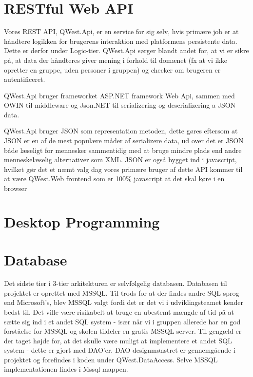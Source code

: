 \section{RESTful Web API}\label{sec:REST}
Vores REST API, QWest.Api, er en service for sig selv, hvis primære job er at håndtere logikken for brugerens interaktion med platformens persistente data. Dette er derfor under Logic-tier. QWest.Api sørger blandt andet for, at vi er sikre på, at data der håndteres giver mening i forhold til domænet (fx at vi ikke opretter en gruppe, uden personer i gruppen) og checker om brugeren er autentificeret.

QWest.Api bruger frameworket ASP.NET framework Web Api, sammen med OWIN\cite{Owin} til middleware og Json.NET til serializering og deserializering a JSON data.

QWest.Api bruger JSON som representation metoden, dette gøres eftersom at JSON er en af de mest populære måder af serializere data, ud over det er JSON både læseligt for mennesker sammentidig med at bruge mindre plads end andre menneskelæselig alternativer som XML. JSON er også bygget ind i javascript, hvilket gør det et næmt valg dag vores primære bruger af dette API kommer til at være QWest.Web frontend som er 100\% javascript at det skal køre i en browser

\section{Desktop Programming}\label{sec:deskProgramming}

\section{Database}\label{sec:database}
Det sidste tier i 3-tier arkitekturen er selvfølgelig databasen. Databasen til projektet er oprettet med MSSQL\cite{MSSQL}. Til trods for at der findes andre SQL sprog end Microsoft's, blev MSSQL valgt fordi det er det vi i udviklingsteamet kender bedst til. Det ville være risikabelt at bruge en ubestemt mængde af tid på at sætte sig ind i et andet SQL system - især når vi i gruppen allerede har en god forståelse for MSSQL og skolen tildeler en gratis MSSQL server. Til gengæld er der taget højde for, at det skulle være muligt at implementere et andet SQL system - dette er gjort med DAO'er. DAO\cite{dao} designmønstret er gennemgående i projektet og forefindes i koden under QWest.DataAccess. Selve MSSQL implementationen findes i Mssql mappen.

